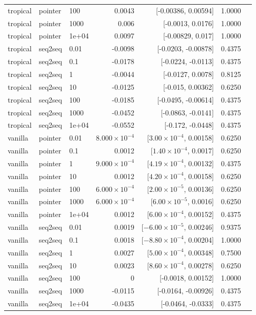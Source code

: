 \documentclass[10pt]{article}
\begin{document}
{\begin{longtable}{lllrrrl}
tropical & pointer & 100 & 0.0043 & [-0.00386, 0.00594] & 1.0000 & \\
tropical & pointer & 1000 & 0.006 & [-0.0013, 0.0176] & 1.0000 & \\
tropical & pointer & 1e+04 & 0.0097 & [-0.00829, 0.017] & 1.0000 & \\
tropical & seq2seq & 0.01 & -0.0098 & [-0.0203, -0.00878] & 0.4375 & \\
tropical & seq2seq & 0.1 & -0.0178 & [-0.0224, -0.0113] & 0.4375 & \\
tropical & seq2seq & 1 & -0.0044 & [-0.0127, 0.0078] & 0.8125 & \\
tropical & seq2seq & 10 & -0.0125 & [-0.015, 0.00362] & 0.6250 & \\
tropical & seq2seq & 100 & -0.0185 & [-0.0495, -0.00614] & 0.4375 & \\
tropical & seq2seq & 1000 & -0.0452 & [-0.0863, -0.0141] & 0.4375 & \\
tropical & seq2seq & 1e+04 & -0.0552 & [-0.172, -0.0448] & 0.4375 & \\
vanilla & pointer & 0.01 & $8.000\times10^{-4}$ & [$3.00\times10^{-4}$, 0.00158] & 0.6250 & \\
vanilla & pointer & 0.1 & 0.0012 & [$1.40\times10^{-4}$, 0.0017] & 0.6250 & \\
vanilla & pointer & 1 & $9.000\times10^{-4}$ & [$4.19\times10^{-4}$, 0.00132] & 0.4375 & \\
vanilla & pointer & 10 & 0.0012 & [$4.20\times10^{-4}$, 0.00158] & 0.6250 & \\
vanilla & pointer & 100 & $6.000\times10^{-4}$ & [$2.00\times10^{-5}$, 0.00136] & 0.6250 & \\
vanilla & pointer & 1000 & $6.000\times10^{-4}$ & [$6.00\times10^{-5}$, 0.0016] & 0.6250 & \\
vanilla & pointer & 1e+04 & 0.0012 & [$6.00\times10^{-4}$, 0.00152] & 0.4375 & \\
vanilla & seq2seq & 0.01 & 0.0019 & [$-6.00\times10^{-5}$, 0.00246] & 0.9375 & \\
vanilla & seq2seq & 0.1 & 0.0018 & [$-8.80\times10^{-4}$, 0.00204] & 1.0000 & \\
vanilla & seq2seq & 1 & 0.0027 & [$5.00\times10^{-4}$, 0.00348] & 0.7500 & \\
vanilla & seq2seq & 10 & 0.0023 & [$8.60\times10^{-4}$, 0.00278] & 0.6250 & \\
vanilla & seq2seq & 100 & 0 & [-0.0018, 0.00152] & 1.0000 & \\
vanilla & seq2seq & 1000 & -0.0115 & [-0.0164, -0.00926] & 0.4375 & \\
vanilla & seq2seq & 1e+04 & -0.0435 & [-0.0464, -0.0333] & 0.4375 & \\
\bottomrule
\end{longtable}
}
\end{document}
